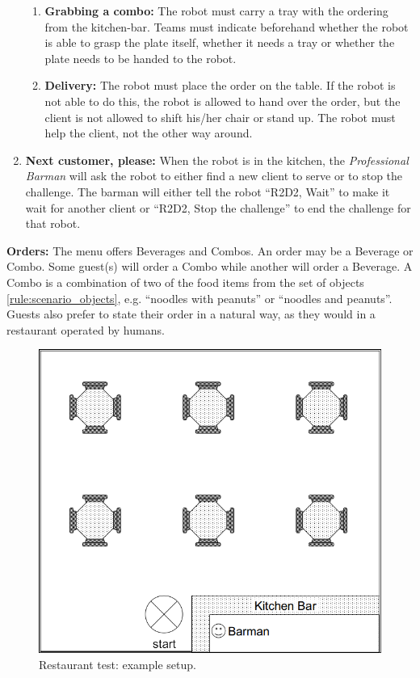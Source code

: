 \begin{enumerate}
\begin{enumerate}
		\item \textbf{Grabbing a combo:}  The robot must carry a tray with the ordering from the kitchen-bar. 
		Teams must indicate beforehand whether the robot is able to grasp the plate itself, whether it needs a tray or whether the plate needs to be handed to the robot.
		
		\item \textbf{Delivery:} The robot must place the order on the table. 
		If the robot is not able to do this, the robot is allowed to hand over the order, but the client is not allowed to shift his/her chair or stand up. 
		The robot must help the client, not the other way around. 
	\end{enumerate}
	
	\item \textbf{Next customer, please:} When the robot is in the kitchen, the \textit{Professional Barman} will ask the robot to either find a new client to serve or to stop the challenge.
	The barman will either tell the robot ``R2D2, Wait'' to make it wait for another client or ``R2D2, Stop the challenge'' to end the challenge for that robot. 
\end{enumerate}

\textbf{Orders:} The menu offers Beverages and Combos. An order may be a Beverage or Combo. Some guest(s) will order a Combo while another will order a Beverage.
  A Combo is a combination of two of the food items from the set of objects \ref{rule:scenario_objects}, e.g. ``noodles with peanuts'' or ``noodles and peanuts''. 
  Guests also prefer to state their order in a natural way, as they would in a restaurant operated by humans.
  
\begin{figure}[tbp]
	\centering
	\includegraphics[width=0.5\columnwidth]{images/restaurant.png}
	\caption{Restaurant test: example setup.}
	\label{fig:restaurant}
\end{figure}

